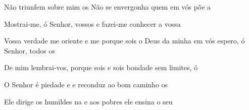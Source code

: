 \begin{greenumerate}
  \item {}Não triunfem sobre mim os  Não se envergonha quem em vós põe a 

  \item {}Mostrai-me, ó Senhor, vossos  e fazei-me conhecer a vossa 

  \item {}Vossa verdade me oriente e me  porque sois o Deus da minha  em vós espero, ó Senhor, todos os 

  \item {}De mim lembrai-vos, porque sois  e sois bondade sem limites, ó 

  \item {}O Senhor é piedade e  e reconduz ao bom caminho os 

  \item {}Ele dirige os humildes na  e aos pobres ele ensina o seu 
\end{greenumerate}